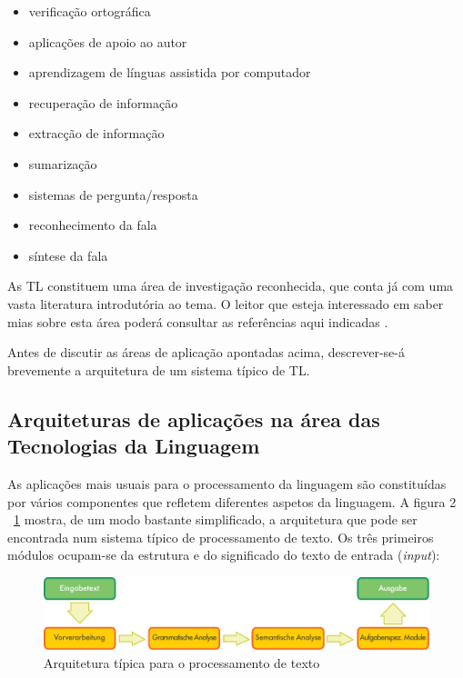 \documentclass[]{../metanetpaper}
\begin{document}
\begin{multicols}{2}
\begin{itemize}
      \item verificação ortográfica
      \item aplicações de apoio ao autor
      \item aprendizagem de línguas assistida por computador
      \item recuperação de informação 
      \item extracção de informação
      \item sumarização
      \item sistemas de pergunta/resposta
      \item reconhecimento da fala 
      \item síntese da fala 
\end{itemize}

As TL constituem uma área de investigação reconhecida, que conta já com uma vasta literatura introdutória ao tema. O leitor que esteja interessado em saber mias sobre esta área poderá consultar as referências aqui indicadas \cite{carstensen-etal1} \cite{jurafsky-martin01} \cite{manning-schuetze1} \cite{lt-world1} \cite{lt-survey1}.

 Antes de discutir as áreas de aplicação apontadas acima, descrever-se-á brevemente a arquitetura de um sistema típico de TL. 

\subsection{Arquiteturas de aplicações na área das Tecnologias da Linguagem}

 As aplicações mais usuais para o processamento da linguagem são constituídas por vários componentes que refletem diferentes aspetos da linguagem. A figura 2 ~\ref{fig:textprocessingarch_de} mostra, de um modo bastante simplificado, a arquitetura que pode ser encontrada num sistema típico de processamento de texto. Os três primeiros módulos ocupam-se da estrutura e do significado do texto de entrada (\textit{input}):

\begin{figure}[htb]
  \center
  \includegraphics[width=\textwidth]{../_media/german/text_processing_app_architecture}
  \caption{Arquitetura típica para o processamento de texto}
  \label{fig:textprocessingarch_de}
\end{figure}


\end{multicols}
\end{document}
